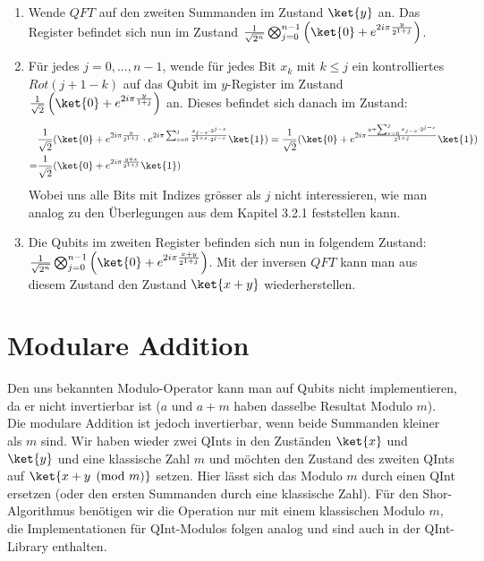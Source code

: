 \begin{enumerate}
    \item Wende $QFT$ auf den zweiten Summanden im Zustand $\ket{y}$ an. Das Register befindet sich nun im Zustand $\frac{1}{\sqrt{2^n}}\bigotimes_{j = 0}^{n - 1}\left(\ket{0} + e^{2i\pi\frac{y}{2^{1 + j}}}\right)$.
    \item Für jedes $j = 0, ..., n - 1$, wende für jedes Bit $x_k$ mit $k \leq j$ ein kontrolliertes $Rot(j + 1 - k)$ auf das Qubit im $y$-Register im Zustand $\frac{1}{\sqrt{2}}\left(\ket{0} + e^{2i\pi\frac{y}{1 + j}}\right)$ an. Dieses befindet sich danach im Zustand:
    \begin{align*}
        &\frac{1}{\sqrt{2}}(\ket{0} + e^{2i\pi\frac{y}{2^{1 + j}}}\cdot e^{2i\pi\sum_{s = 0}^{j}\frac{x_{j - s}\cdot 2^{j - s}}{2^{1 + s}\cdot2^{j - s}}}\ket{1}) 
        = \frac{1}{\sqrt{2}}(\ket{0} + e^{2i\pi\frac{y + \sum_{s = 0}^{j}{x_{j - s}\cdot2^{j - s}}}{2^{1 + j}}}\ket{1}) \\ = &\frac{1}{\sqrt{2}}(\ket{0} + e^{2i\pi\frac{y + x}{2^{1 + j}}}\ket{1})
    \end{align*}
    Wobei uns alle Bits mit Indizes grösser als $j$ nicht interessieren, wie man analog zu den Überlegungen aus dem Kapitel 3.2.1 feststellen kann.
    \item Die Qubits im zweiten Register befinden sich nun in folgendem Zustand: $\frac{1}{\sqrt{2^n}}\bigotimes_{j = 0}^{n - 1}\left(\ket{0} + e^{2i\pi\frac{x + y}{2^{1 + j}}}\right)$. Mit der inversen $QFT$ kann man aus diesem Zustand den Zustand $\ket{x + y}$ wiederherstellen.
\end{enumerate}
\section{Modulare Addition}
Den uns bekannten Modulo-Operator kann man auf Qubits nicht implementieren, da er nicht invertierbar ist ($a$ und $a + m$ haben dasselbe Resultat Modulo $m$). Die modulare Addition ist jedoch invertierbar, wenn beide Summanden kleiner als $m$ sind. Wir haben wieder zwei QInts in den Zuständen $\ket{x}$ und $\ket{y}$ und eine klassische Zahl $m$ und möchten den Zustand des zweiten QInts auf $\ket{x + y \pmod{m}}$ setzen. Hier lässt sich das Modulo $m$ durch einen QInt ersetzen (oder den ersten Summanden durch eine klassische Zahl). Für den Shor-Algorithmus benötigen wir die Operation nur mit einem klassischen Modulo $m$, die Implementationen für QInt-Modulos folgen analog und sind auch in der QInt-Library enthalten.

